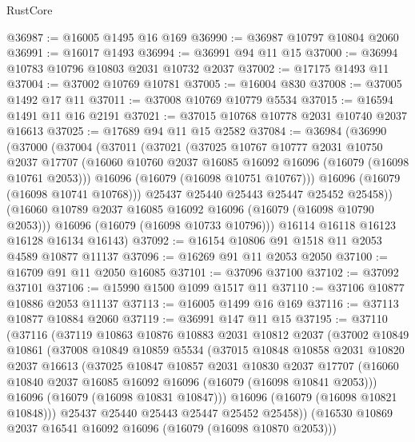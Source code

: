 \begin{lexlean}{RustCore}
\begin{coremodule}
@36987 := @16005 @1495 @16 @169
@36990 := @36987 @10797 @10804 @2060
@36991 := @16017 @1493
@36994 := @36991 @94 @11 @15
@37000 := @36994 @10783 @10796 @10803 @2031 @10732 @2037
@37002 := @17175 @1493 @11
@37004 := @37002 @10769 @10781
@37005 := @16004 @830
@37008 := @37005 @1492 @17 @11
@37011 := @37008 @10769 @10779 @5534
@37015 := @16594 @1491 @11 @16 @2191
@37021 := @37015 @10768 @10778 @2031 @10740 @2037 @16613
@37025 := @17689 @94 @11 @15 @2582
@37084 := @36984
    (@36990
      (@37000
        (@37004
          (@37011
            (@37021
              (@37025
                @10767
                @10777
                @2031
                @10750
                @2037
                @17707
                (@16060 @10760 @2037 @16085 @16092 @16096 (@16079 (@16098 @10761 @2053)))
                @16096
                (@16079 (@16098 @10751 @10767)))
              @16096
              (@16079 (@16098 @10741 @10768)))
            @25437
            @25440
            @25443
            @25447
            @25452
            @25458))
        (@16060 @10789 @2037 @16085 @16092 @16096 (@16079 (@16098 @10790 @2053)))
        @16096
        (@16079 (@16098 @10733 @10796)))
      @16114
      @16118
      @16123
      @16128
      @16134
      @16143)
@37092 := @16154 @10806 @91 @1518 @11 @2053 @4589 @10877 @11137
@37096 := @16269 @91 @11 @2053 @2050
@37100 := @16709 @91 @11 @2050 @16085
@37101 := @37096 @37100
@37102 := @37092 @37101
@37106 := @15990 @1500 @1099 @1517 @11
@37110 := @37106 @10877 @10886 @2053 @11137
@37113 := @16005 @1499 @16 @169
@37116 := @37113 @10877 @10884 @2060
@37119 := @36991 @147 @11 @15
@37195 := @37110
    (@37116
      (@37119
        @10863
        @10876
        @10883
        @2031
        @10812
        @2037
        (@37002
          @10849
          @10861
          (@37008
            @10849
            @10859
            @5534
            (@37015
              @10848
              @10858
              @2031
              @10820
              @2037
              @16613
              (@37025
                @10847
                @10857
                @2031
                @10830
                @2037
                @17707
                (@16060 @10840 @2037 @16085 @16092 @16096 (@16079 (@16098 @10841 @2053)))
                @16096
                (@16079 (@16098 @10831 @10847)))
              @16096
              (@16079 (@16098 @10821 @10848)))
            @25437
            @25440
            @25443
            @25447
            @25452
            @25458))
        (@16530 @10869 @2037 @16541 @16092 @16096 (@16079 (@16098 @10870 @2053)))

\end{coremodule}
\end{lexlean}
